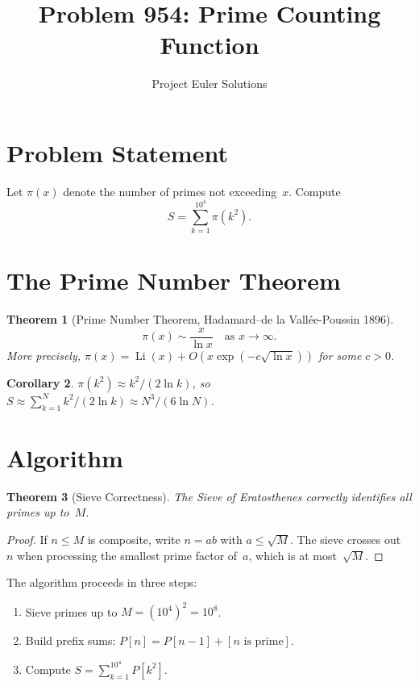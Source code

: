 \documentclass[11pt]{article}
\title{Problem 954: Prime Counting Function}
\author{Project Euler Solutions}
\date{}
\newtheorem{theorem}{Theorem}
\newtheorem{corollary}[theorem]{Corollary}
\begin{document}
\maketitle

\section{Problem Statement}

Let $\pi(x)$ denote the number of primes not exceeding~$x$. Compute
\[
S = \sum_{k=1}^{10^4} \pi(k^2).
\]

\section{The Prime Number Theorem}

\begin{theorem}[Prime Number Theorem, Hadamard--de la Vall\'ee-Poussin 1896]
\[
\pi(x) \sim \frac{x}{\ln x} \quad \text{as } x \to \infty.
\]
More precisely, $\pi(x) = \operatorname{Li}(x) + O(x \exp(-c\sqrt{\ln x}))$ for some $c > 0$.
\end{theorem}

\begin{corollary}
$\pi(k^2) \approx k^2 / (2\ln k)$, so $S \approx \sum_{k=1}^{N} k^2/(2\ln k) \approx N^3/(6\ln N)$.
\end{corollary}

\section{Algorithm}

\begin{theorem}[Sieve Correctness]
The Sieve of Eratosthenes correctly identifies all primes up to~$M$.
\end{theorem}

\begin{proof}
If $n \le M$ is composite, write $n = ab$ with $a \le \sqrt{M}$. The sieve crosses out~$n$ when processing the smallest prime factor of~$a$, which is at most~$\sqrt{M}$.
\end{proof}

The algorithm proceeds in three steps:
\begin{enumerate}
\item Sieve primes up to $M = (10^4)^2 = 10^8$.
\item Build prefix sums: $P[n] = P[n-1] + [n\text{ is prime}]$.
\item Compute $S = \sum_{k=1}^{10^4} P[k^2]$.
\end{enumerate}
\end{document}
